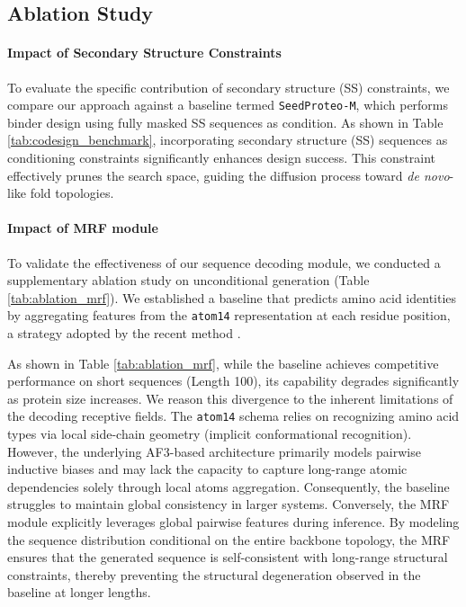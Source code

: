 \subsection{Ablation Study}
\paragraph{Impact of Secondary Structure Constraints}
To evaluate the specific contribution of secondary structure (SS) constraints, we compare our approach against a baseline termed \texttt{SeedProteo-M}, which performs binder design using fully masked SS sequences as condition. As shown in Table \ref{tab:codesign_benchmark}, incorporating secondary structure (SS) sequences as conditioning constraints significantly enhances design success. This constraint effectively prunes the search space, guiding the diffusion process toward \textit{de novo}-like fold topologies.

\paragraph{Impact of MRF module}
To validate the effectiveness of our sequence decoding module, we conducted a supplementary ablation study on unconditional generation (Table \ref{tab:ablation_mrf}). We established a baseline that predicts amino acid identities by aggregating features from the \texttt{atom14} representation at each residue position, a strategy adopted by the recent method \cite{quPallatomUnlockingNew2025}.

As shown in Table \ref{tab:ablation_mrf}, while the baseline achieves competitive performance on short sequences (Length 100), its capability degrades significantly as protein size increases. We reason this divergence to the inherent limitations of the decoding receptive fields. The \texttt{atom14} schema relies on recognizing amino acid types via local side-chain geometry (implicit conformational recognition). However, the underlying AF3-based architecture primarily models pairwise inductive biases and may lack the capacity to capture long-range atomic dependencies solely through local atoms aggregation. Consequently, the baseline struggles to maintain global consistency in larger systems. Conversely, the MRF module explicitly leverages global pairwise features during inference. By modeling the sequence distribution conditional on the entire backbone topology, the MRF ensures that the generated sequence is self-consistent with long-range structural constraints, thereby preventing the structural degeneration observed in the baseline at longer lengths.


